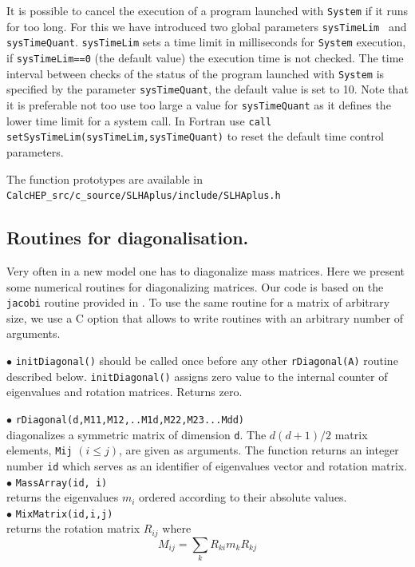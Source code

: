 \documentclass[12pt,a4paper]{article}
\begin{document}
{It is possible to cancel the execution of a program launched with  \verb|System|  if it runs for too long. For this we have introduced two
global parameters  {\tt  sysTimeLim } and {\tt  sysTimeQuant}.
{\tt  sysTimeLim} sets a time limit  in milliseconds for {\tt System} execution, if 
{\tt  sysTimeLim==0} (the default value) the execution time is not checked. 
The time interval between checks of the status of the program launched with  \verb|System|  is specified by the parameter
{\tt sysTimeQuant}, the default value is set to 10.  
Note that it is preferable not too use too large a value for {\tt sysTimeQuant} as it defines the lower time limit for a system call. 
In Fortran use \verb|call setSysTimeLim(sysTimeLim,sysTimeQuant)| to reset the default time control
parameters. 


The  function prototypes are available  in \\
\verb|CalcHEP_src/c_source/SLHAplus/include/SLHAplus.h|

\subsection{Routines for diagonalisation.}

Very often in a new model  one has to diagonalize 
mass matrices. Here we present some numerical routines for 
diagonalizing matrices. Our code is based on the \verb|jacobi| routine provided in 
 \cite{Numerical}. To use the same routine for a matrix of arbitrary size, we 
use a C option that allows to write routines with an arbitrary number of arguments. 

\noindent 
$\bullet$ \verb|initDiagonal()| should be called once  before any other 
\verb|rDiagonal(A)| routine described below. \verb|initDiagonal()| assigns zero value 
to the internal counter of  eigenvalues and rotation matrices. Returns zero.

\noindent
$\bullet$ \verb|rDiagonal(d,M11,M12,..M1d,M22,M23...Mdd)|\\
diagonalizes a symmetric matrix of dimension \verb|d|. The  
$d(d+1)/2$  matrix elements, \verb|Mij| $(i\le j)$, are given as arguments.
The function returns an integer number \verb|id| which serves as an  identifier 
of eigenvalues vector and rotation matrix.\\
\noindent
$\bullet$ \verb|MassArray(id, i)|\\ returns the eigenvalues  $m_i$ ordered according to 
their absolute values. \\
\noindent
$\bullet$ \verb|MixMatrix(id,i,j)|\\ returns the rotation matrix  $R_{ij}$ where
$$  M_{ij} = \sum\limits_k  R_{ki} m_k R_{kj}$$

}
\end{document}
